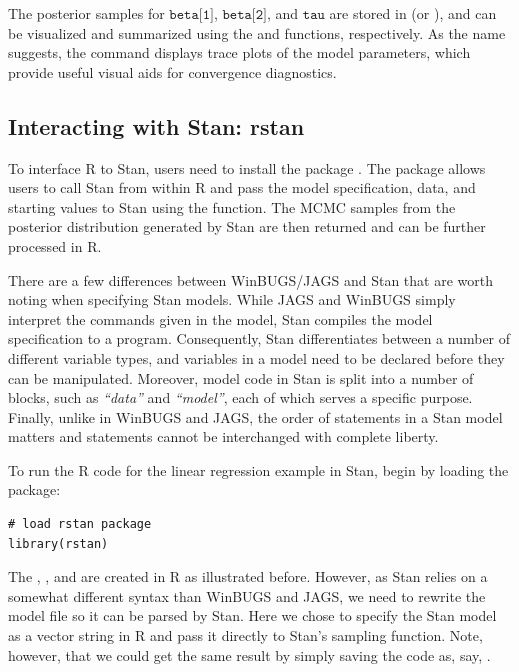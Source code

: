 \noindent The posterior samples for $\texttt{beta[1]}$, $\texttt{beta[2]}$, and $\texttt{tau}$ are stored in  (or ), and can be visualized and summarized using the  and  functions, respectively. As the name suggests, the  command displays trace plots of the model parameters, which provide useful visual aids for convergence diagnostics.



\subsection{Interacting with Stan: rstan}
To interface R to Stan, users need to install the  package \cite{Guo2015rstan}. The  package allows users to call Stan from within R and pass the model specification, data, and starting values to Stan using the  function. The MCMC samples from the posterior distribution generated by Stan are then returned and can be further processed in R.

There are a few differences between WinBUGS/JAGS and Stan that are worth noting when specifying Stan models. While JAGS and WinBUGS simply interpret the commands given in the model, Stan compiles the model specification to a  program. Consequently, Stan differentiates between a number of different variable types, and variables in a model need to be declared before they can be manipulated. Moreover, model code in Stan is split into a number of blocks, such as \emph{``data''} and \emph{``model''}, each of which serves a specific purpose. Finally, unlike in WinBUGS and JAGS, the order of statements in a Stan model matters and statements cannot be interchanged with complete liberty.

To run the R code for the linear regression example in Stan, begin by loading the  package:

\begin{lstlisting}
# load rstan package
library(rstan)
\end{lstlisting}

\noindent The , , and  are created in R as illustrated before. However, as Stan relies on a somewhat different syntax than WinBUGS and JAGS, we need to rewrite the model file so it can be parsed by Stan. Here we chose to specify the Stan model as a vector string in R and pass it directly to Stan's sampling function. Note, however, that we could get the same result by simply saving the code as, say, .

